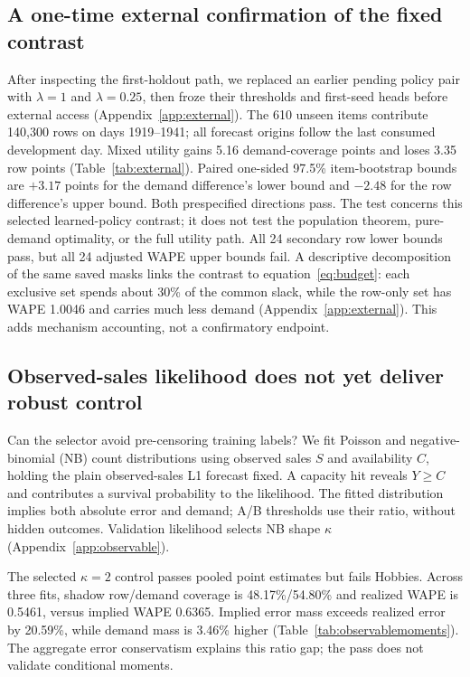 \documentclass{article}
\begin{document}
\FloatBarrier

\subsection{A one-time external confirmation of the fixed contrast}
\label{sec:external}
After inspecting the first-holdout path, we replaced an earlier pending policy pair with $\lambda=1$ and $\lambda=0.25$, then froze their thresholds and first-seed heads before external access (Appendix~\ref{app:external}). The 610 unseen items contribute 140,300 rows on days 1919--1941; all forecast origins follow the last consumed development day. Mixed utility gains 5.16 demand-coverage points and loses 3.35 row points (Table~\ref{tab:external}). Paired one-sided 97.5\% item-bootstrap bounds are $+3.17$ points for the demand difference's lower bound and $-2.48$ for the row difference's upper bound. Both prespecified directions pass. The test concerns this selected learned-policy contrast; it does not test the population theorem, pure-demand optimality, or the full utility path.
All 24 secondary row lower bounds pass, but all 24 adjusted WAPE upper bounds fail. A descriptive decomposition of the same saved masks links the contrast to equation~\eqref{eq:budget}: each exclusive set spends about 30\% of the common slack, while the row-only set has WAPE 1.0046 and carries much less demand (Appendix~\ref{app:external}). This adds mechanism accounting, not a confirmatory endpoint.

\subsection{Observed-sales likelihood does not yet deliver robust control}
\label{sec:observable}
Can the selector avoid pre-censoring training labels? We fit Poisson and negative-binomial (NB) count distributions using observed sales $S$ and availability $C$, holding the plain observed-sales L1 forecast fixed. A capacity hit reveals $Y\geq C$ and contributes a survival probability to the likelihood. The fitted distribution implies both absolute error and demand; A/B thresholds use their ratio, without hidden outcomes. Validation likelihood selects NB shape $\kappa$ (Appendix~\ref{app:observable}).

The selected $\kappa=2$ control passes pooled point estimates but fails Hobbies. Across three fits, shadow row/demand coverage is 48.17\%/54.80\% and realized WAPE is 0.5461, versus implied WAPE 0.6365. Implied error mass exceeds realized error by 20.59\%, while demand mass is 3.46\% higher (Table~\ref{tab:observablemoments}). The aggregate error conservatism explains this ratio gap; the pass does not validate conditional moments.
\end{document}
